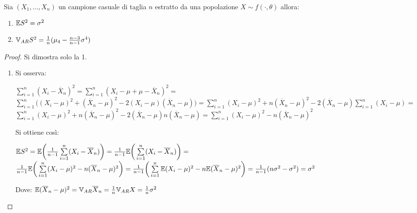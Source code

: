 \newcommand{\sliin}{\sum\limits_{i=1}^n}
\newcommand{\slin}{\sum\limits_{i=0}^n}
\newcommand{\sliinf}{\sum\limits_{i=1}^{+\infty}}
\newcommand{\slinf}{\sum\limits_{i=0}^{+\infty}}
\begin{theorem} \label{teor_20}
Sia $(X_1,...,X_n)$ un campione casuale di taglia $n$ estratto da una popolazione $X\sim f(\cdot,\theta)$ allora:
\begin{enumerate}
    \item $\mathbb{E} S^2=\sigma^2$ 
    \item $\mathbb{V}_{AR} S^2=\frac{1}{n}(\mu_4-\frac{n-3}{n-1}\sigma^4)$
\end{enumerate}

\begin{proof}
Si dimostra solo la 1.
\newline
\begin{enumerate}
    \item Si osserva:
    \begin{center}
        $\sliin(X_i-\overline{X}_n)^2=\sliin(X_i-\mu+\mu-\overline{X}_n)^2=$
        \newline
        $\sliin\Big( (X_i-\mu)^2+(\overline{X}_n-\mu)^2-2(X_i-\mu)(\overline{X}_n-\mu))=\sliin(X_i-\mu)^2+n(\overline{X}_n-\mu)^2-2(\overline{X}_n-\mu)\sliin(X_i-\mu)=$
        \newline
        $\sliin(X_i-\mu)^2+n(\overline{X}_n-\mu)^2-2(\overline{X}_n-\mu)n(\overline{X}_n-\mu)=\sliin(X_i-\mu)^2-n(\overline{X}_n-\mu)^2$
    \end{center}
    Si ottiene così:
    \begin{center}
        $\E S^2=\E \bigg(\frac{1}{n-1}\sliin(X_i-\overline{X}_n)\bigg)=\frac{1}{n-1}\E\bigg(\sliin(X_i-\overline{X}_n)\bigg)=$
        \vspace{5px}
        \newline
        $\frac{1}{n-1}\E\bigg(\sliin(X_i-\mu)^2-n(\overline{X}_n-\mu)^2\bigg)=\frac{1}{n-1}\bigg(\sliin\E(X_i-\mu)^2-n\E(\overline{X}_n-\mu)^2\bigg)=\frac{1}{n-1}(n\sigma^2-\sigma^2)=\sigma^2$
    \end{center}
    \vspace{5px}
    Dove: $\mathbb{E} (\overline{X}_n-\mu)^2=\mathbb{V}_{AR} \overline{X}_n=\frac{1}{n}\mathbb{V}_{AR} X=\frac{1}{n}\sigma^2$
\end{enumerate}
\end{proof}
\end{theorem}


